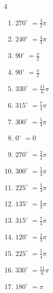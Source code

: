 \begin{multicols}{4}
\begin{enumerate}
  \item $\displaystyle 270^{\circ}$
        $\displaystyle =\frac{3}{2}\pi$

  \item $\displaystyle 240^{\circ}$
        $\displaystyle =\frac{4}{3}\pi$

  \item $\displaystyle 90^{\circ}$
        $\displaystyle =\frac{\pi}{2}$

  \item $\displaystyle 90^{\circ}$
        $\displaystyle =\frac{\pi}{2}$

  \item $\displaystyle 330^{\circ}$
        $\displaystyle =\frac{11}{6}\pi$

  \item $\displaystyle 315^{\circ}$
        $\displaystyle =\frac{7}{4}\pi$

  \item $\displaystyle 300^{\circ}$
        $\displaystyle =\frac{5}{3}\pi$

  \item $\displaystyle 0^{\circ}$
        $\displaystyle =0$

  \item $\displaystyle 270^{\circ}$
        $\displaystyle =\frac{3}{2}\pi$

  \item $\displaystyle 300^{\circ}$
        $\displaystyle =\frac{5}{3}\pi$

  \item $\displaystyle 225^{\circ}$
        $\displaystyle =\frac{5}{4}\pi$

  \item $\displaystyle 135^{\circ}$
        $\displaystyle =\frac{3}{4}\pi$

  \item $\displaystyle 315^{\circ}$
        $\displaystyle =\frac{7}{4}\pi$

  \item $\displaystyle 120^{\circ}$
        $\displaystyle =\frac{2}{3}\pi$

  \item $\displaystyle 225^{\circ}$
        $\displaystyle =\frac{5}{4}\pi$

  \item $\displaystyle 330^{\circ}$
        $\displaystyle =\frac{11}{6}\pi$

  \item $\displaystyle 180^{\circ}$
        $\displaystyle =\pi$


\end{enumerate}
\end{multicols}
